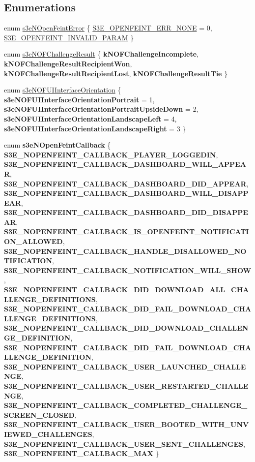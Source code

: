 \subsection*{Enumerations}
\begin{DoxyCompactItemize}
\item 
enum \hyperlink{group___n_open_feint_api_group_ga6ef9ed4c26e06a1b4d5b3d0004ea28bd}{s3eNOpenFeintError} \{ \hyperlink{group___n_open_feint_api_group_gga6ef9ed4c26e06a1b4d5b3d0004ea28bda018802c719a4ef52c8336d5c320e5d93}{S3E\_\-OPENFEINT\_\-ERR\_\-NONE} =  0, 
\hyperlink{group___n_open_feint_api_group_gga6ef9ed4c26e06a1b4d5b3d0004ea28bdaacb2649c2babd512a412065e906109c4}{S3E\_\-OPENFEINT\_\-INVALID\_\-PARAM}
 \}
\item 
enum \hyperlink{group___n_open_feint_api_group_ga954444cdbeafa2947e969f78ed1e29f4}{s3eNOFChallengeResult} \{ {\bfseries kNOFChallengeIncomplete}, 
{\bfseries kNOFChallengeResultRecipientWon}, 
{\bfseries kNOFChallengeResultRecipientLost}, 
{\bfseries kNOFChallengeResultTie}
 \}
\item 
enum \hyperlink{group___n_open_feint_api_group_gac32b01451990bbfa1b6e2fe38e01262b}{s3eNOFUIInterfaceOrientation} \{ {\bfseries s3eNOFUIInterfaceOrientationPortrait} =  1, 
{\bfseries s3eNOFUIInterfaceOrientationPortraitUpsideDown} =  2, 
{\bfseries s3eNOFUIInterfaceOrientationLandscapeLeft} =  4, 
{\bfseries s3eNOFUIInterfaceOrientationLandscapeRight} =  3
 \}
\item 
enum {\bfseries s3eNOpenFeintCallback} \{ {\bfseries S3E\_\-NOPENFEINT\_\-CALLBACK\_\-PLAYER\_\-LOGGEDIN}, 
{\bfseries S3E\_\-NOPENFEINT\_\-CALLBACK\_\-DASHBOARD\_\-WILL\_\-APPEAR}, 
{\bfseries S3E\_\-NOPENFEINT\_\-CALLBACK\_\-DASHBOARD\_\-DID\_\-APPEAR}, 
{\bfseries S3E\_\-NOPENFEINT\_\-CALLBACK\_\-DASHBOARD\_\-WILL\_\-DISAPPEAR}, 
{\bfseries S3E\_\-NOPENFEINT\_\-CALLBACK\_\-DASHBOARD\_\-DID\_\-DISAPPEAR}, 
{\bfseries S3E\_\-NOPENFEINT\_\-CALLBACK\_\-IS\_\-OPENFEINT\_\-NOTIFICATION\_\-ALLOWED}, 
{\bfseries S3E\_\-NOPENFEINT\_\-CALLBACK\_\-HANDLE\_\-DISALLOWED\_\-NOTIFICATION}, 
{\bfseries S3E\_\-NOPENFEINT\_\-CALLBACK\_\-NOTIFICATION\_\-WILL\_\-SHOW}, 
{\bfseries S3E\_\-NOPENFEINT\_\-CALLBACK\_\-DID\_\-DOWNLOAD\_\-ALL\_\-CHALLENGE\_\-DEFINITIONS}, 
{\bfseries S3E\_\-NOPENFEINT\_\-CALLBACK\_\-DID\_\-FAIL\_\-DOWNLOAD\_\-CHALLENGE\_\-DEFINITIONS}, 
{\bfseries S3E\_\-NOPENFEINT\_\-CALLBACK\_\-DID\_\-DOWNLOAD\_\-CHALLENGE\_\-DEFINITION}, 
{\bfseries S3E\_\-NOPENFEINT\_\-CALLBACK\_\-DID\_\-FAIL\_\-DOWNLOAD\_\-CHALLENGE\_\-DEFINITION}, 
{\bfseries S3E\_\-NOPENFEINT\_\-CALLBACK\_\-USER\_\-LAUNCHED\_\-CHALLENGE}, 
{\bfseries S3E\_\-NOPENFEINT\_\-CALLBACK\_\-USER\_\-RESTARTED\_\-CHALLENGE}, 
{\bfseries S3E\_\-NOPENFEINT\_\-CALLBACK\_\-COMPLETED\_\-CHALLENGE\_\-SCREEN\_\-CLOSED}, 
{\bfseries S3E\_\-NOPENFEINT\_\-CALLBACK\_\-USER\_\-BOOTED\_\-WITH\_\-UNVIEWED\_\-CHALLENGES}, 
{\bfseries S3E\_\-NOPENFEINT\_\-CALLBACK\_\-USER\_\-SENT\_\-CHALLENGES}, 
{\bfseries S3E\_\-NOPENFEINT\_\-CALLBACK\_\-MAX}
 \}
\end{DoxyCompactItemize}
